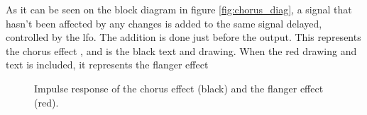 As it can be seen on the block diagram in figure \autoref{fig:chorus_diag}, a signal that hasn't been affected by any changes is added to the same signal delayed, controlled by the \gls{lfo}. The addition is done just before the output. This represents the chorus effect \citep{chorus_projectpaper}, and is the black text and drawing. When the red drawing and text is included, it represents the flanger effect  \\

\begin{figure}
\centering
\def\svgwidth{\columnwidth}

\caption{Impulse response of the chorus effect (black) and the flanger effect (red).}
		\label{fig:chorus_and_flanger_time}
\end{figure}









